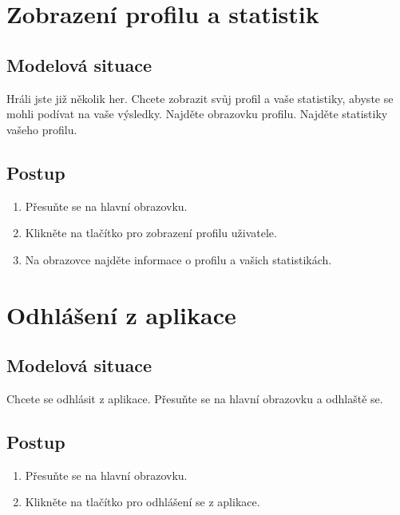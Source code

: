 \section{Zobrazení profilu a statistik}
\label{scen:profile}

\subsection*{Modelová situace}

Hráli jste již několik her.
Chcete zobrazit svůj profil a vaše statistiky,
abyste se mohli podívat na vaše výsledky.
Najděte obrazovku profilu.
Najděte statistiky vašeho profilu.

\subsection*{Postup}

\begin{enumerate}
    \item Přesuňte se na hlavní obrazovku.
    \item Klikněte na tlačítko pro zobrazení profilu uživatele.
    \item Na obrazovce najděte informace o profilu a vašich statistikách.
\end{enumerate}

\section{Odhlášení z aplikace}
\label{scen:logout}

\subsection*{Modelová situace}

Chcete se odhlásit z aplikace.
Přesuňte se na hlavní obrazovku a odhlaště se.

\subsection*{Postup}

\begin{enumerate}
    \item Přesuňte se na hlavní obrazovku.
    \item Klikněte na tlačítko pro odhlášení se z aplikace.
\end{enumerate}
